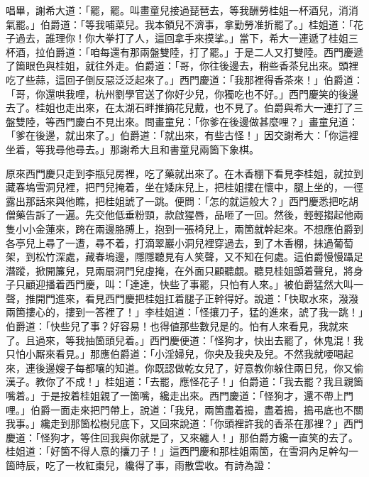 唱畢，謝希大道：「罷，罷。叫畫童兒接過琵琶去，等我酬勞桂姐一杯酒兒，消消氣罷。」{}伯爵道：「等我哺菜兒。我本領兒不濟事，拿勤勞准折罷了。」桂姐道：「花子過去，誰理你！你大拳打了人，這回拿手來摸挲。」當下，希大一連遞了桂姐三杯酒，拉伯爵道：「咱每還有那兩盤雙陸，打了罷。」于是二人又打雙陸。西門慶遞了箇眼色與桂姐，就往外走。伯爵道：「哥，你往後邊去，稍些香茶兒出來。頭裡吃了些蒜，這回子倒反惡泛泛起來了。」西門慶道：「我那裡得香茶來！」伯爵道：「哥，你還哄我哩，杭州劉學官送了你好少兒，你獨吃也不好。」西門慶笑的後邊去了。桂姐也走出來，在太湖石畔推摘花兒戴，也不見了。伯爵與希大一連打了三盤雙陸，等西門慶白不見出來。問畫童兒：「你爹在後邊做甚麼哩？」畫童兒道：「爹在後邊，就出來了。」伯爵道：「就出來，有些古怪！」因交謝希大：「你這裡坐着，等我尋他尋去。」那謝希大且和書童兒兩箇下象棋。

原來西門慶只走到李瓶兒房裡，吃了藥就出來了。在木香棚下看見李桂姐，就拉到藏春塢雪洞兒裡，把門兒掩着，坐在矮床兒上，把桂姐摟在懷中，腿上坐的，一徑露出那話來與他瞧，把桂姐諕了一跳。便問：「怎的就這般大？」西門慶悉把吃胡僧藥告訴了一遍。先交他低垂粉頸，款啟猩唇，品咂了一回。然後，輕輕搊起他兩隻小小金蓮來，跨在兩邊胳膊上，抱到一張椅兒上，兩箇就幹起來。不想應伯爵到各亭兒上尋了一遭，尋不着，打滴翠巖小洞兒裡穿過去，到了木香棚，抹過葡萄架，到松竹深處，藏春塢邊，隱隱聽見有人笑聲，又不知在何處。這伯爵慢慢躡足潛蹤，掀開簾兒，見兩扇洞門兒虛掩，在外面只顧聽覷。聽見桂姐顫着聲兒，將身子只顧迎播着西門慶，叫：「達達，快些了事罷，只怕有人來。」被伯爵猛然大叫一聲，推開門進來，看見西門慶把桂姐扛着腿子正幹得好。說道：「快取水來，潑潑兩箇摟心的，摟到一答裡了！」李桂姐道：「怪攘刀子，猛的進來，諕了我一跳！」伯爵道：「快些兒了事？好容易！也得値那些數兒是的。怕有人來看見，我就來了。且過來，等我抽箇頭兒着。」{}西門慶便道：「怪狗才，快出去罷了，休鬼混！我只怕小厮來看見。」那應伯爵道：「小淫婦兒，你央及我央及兒。不然我就喓喝起來，連後邊嫂子每都嚷的知道。你既認做乾女兒了，好意教你躲住兩日兒，你又偷漢子。教你了不成！」桂姐道：「去罷，應怪花子！」伯爵道：「我去罷？我且親箇嘴着。」于是按着桂姐親了一箇嘴，纔走出來。西門慶道：「怪狗才，還不帶上門哩。」伯爵一面走來把門帶上，說道：「我兒，兩箇盡着搗，盡着搗，搗弔底也不關我事。」纔走到那箇松樹兒底下，又回來說道：{}「你頭裡許我的香茶在那裡？」西門慶道：「怪狗才，等住回我與你就是了，又來纏人！」那伯爵方纔一直笑的去了。桂姐道：「好箇不得人意的攮刀子！」這西門慶和那桂姐兩箇，在雪洞內足幹勾一箇時辰，吃了一枚紅棗兒，纔得了事，雨散雲收。有詩為證：

